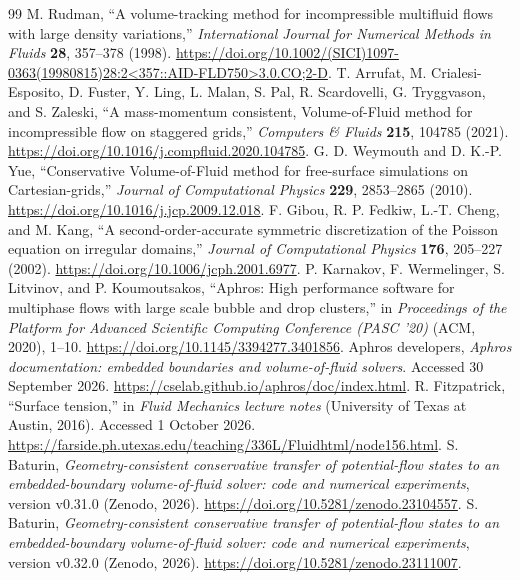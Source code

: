 \documentclass[10pt]{article}
\begin{document}
\begin{thebibliography}{99}
M. Rudman, ``A volume-tracking method for incompressible multifluid flows
with large density variations,'' \emph{International Journal for Numerical
Methods in Fluids} \textbf{28}, 357--378 (1998).
\url{https://doi.org/10.1002/(SICI)1097-0363(19980815)28:2<357::AID-FLD750>3.0.CO;2-D}.
T. Arrufat, M. Crialesi-Esposito, D. Fuster, Y. Ling, L. Malan, S. Pal,
R. Scardovelli, G. Tryggvason, and S. Zaleski,
``A mass-momentum consistent, Volume-of-Fluid method for incompressible
flow on staggered grids,'' \emph{Computers \& Fluids} \textbf{215}, 104785 (2021).
\url{https://doi.org/10.1016/j.compfluid.2020.104785}.
G. D. Weymouth and D. K.-P. Yue,
``Conservative Volume-of-Fluid method for free-surface simulations on
Cartesian-grids,'' \emph{Journal of Computational Physics}
\textbf{229}, 2853--2865 (2010).
\url{https://doi.org/10.1016/j.jcp.2009.12.018}.
F. Gibou, R. P. Fedkiw, L.-T. Cheng, and M. Kang,
``A second-order-accurate symmetric discretization of the Poisson equation
on irregular domains,'' \emph{Journal of Computational Physics}
\textbf{176}, 205--227 (2002).
\url{https://doi.org/10.1006/jcph.2001.6977}.
P. Karnakov, F. Wermelinger, S. Litvinov, and P. Koumoutsakos,
``Aphros: High performance software for multiphase flows with large scale
bubble and drop clusters,'' in \emph{Proceedings of the Platform for Advanced
Scientific Computing Conference (PASC '20)} (ACM, 2020), 1--10.
\url{https://doi.org/10.1145/3394277.3401856}.
Aphros developers, \emph{Aphros documentation: embedded boundaries and
volume-of-fluid solvers}. Accessed 30 September 2026.
\url{https://cselab.github.io/aphros/doc/index.html}.
R. Fitzpatrick, ``Surface tension,'' in \emph{Fluid Mechanics lecture notes}
(University of Texas at Austin, 2016). Accessed 1 October 2026.
\url{https://farside.ph.utexas.edu/teaching/336L/Fluidhtml/node156.html}.
S. Baturin, \emph{Geometry-consistent conservative transfer of potential-flow
states to an embedded-boundary volume-of-fluid solver: code and numerical
experiments}, version v0.31.0 (Zenodo, 2026).
\url{https://doi.org/10.5281/zenodo.23104557}.
S. Baturin, \emph{Geometry-consistent conservative transfer of potential-flow
states to an embedded-boundary volume-of-fluid solver: code and numerical
experiments}, version v0.32.0 (Zenodo, 2026).
\url{https://doi.org/10.5281/zenodo.23111007}.
\end{thebibliography}
\end{document}
